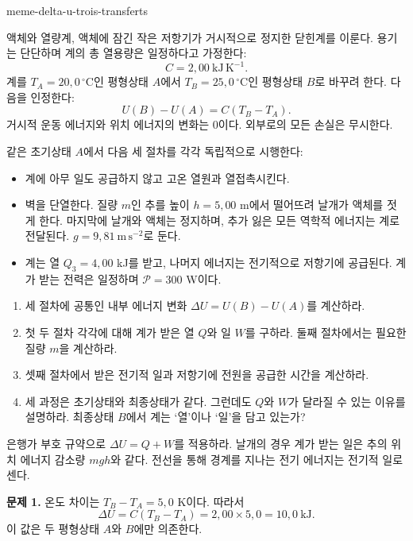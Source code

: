 \begin{exo}[같은 내부 에너지 변화, 세 가지 전달 방식]{meme-delta-u-trois-transferts}

액체와 열량계, 액체에 잠긴 작은 저항기가 거시적으로 정지한 닫힌계를 이룬다.
용기는 단단하며 계의 총 열용량은 일정하다고 가정한다:
\[
C=2{,}00\ \mathrm{kJ\,K^{-1}}.
\]
계를 $T_A=20{,}0\,^\circ\mathrm{C}$인 평형상태 $A$에서
$T_B=25{,}0\,^\circ\mathrm{C}$인 평형상태 $B$로 바꾸려 한다. 다음을 인정한다:
\[
U(B)-U(A)=C(T_B-T_A).
\]
거시적 운동 에너지와 위치 에너지의 변화는 0이다. 외부로의 모든 손실은 무시한다.

같은 초기상태 $A$에서 다음 세 절차를 각각 독립적으로 시행한다:
\begin{itemize}
\item[절차 1] 계에 아무 일도 공급하지 않고 고온 열원과 열접촉시킨다.
\item[절차 2] 벽을 단열한다. 질량 $m$인 추를 높이 $h=5{,}00$ m에서 떨어뜨려 날개가 액체를 젓게 한다. 마지막에 날개와 액체는 정지하며, 추가 잃은 모든 역학적 에너지는 계로 전달된다. $g=9{,}81\ \mathrm{m\,s^{-2}}$로 둔다.
\item[절차 3] 계는 열 $Q_3=4{,}00$ kJ를 받고, 나머지 에너지는 전기적으로 저항기에 공급된다. 계가 받는 전력은 일정하며 $\mathcal P=300$ W이다.
\end{itemize}

\begin{enumerate}
\item 세 절차에 공통인 내부 에너지 변화 $\Delta U=U(B)-U(A)$를 계산하라.
\item 첫 두 절차 각각에 대해 계가 받은 열 $Q$와 일 $W$를 구하라. 둘째 절차에서는 필요한 질량 $m$을 계산하라.
\item 셋째 절차에서 받은 전기적 일과 저항기에 전원을 공급한 시간을 계산하라.
\item 세 과정은 초기상태와 최종상태가 같다. 그런데도 $Q$와 $W$가 달라질 수 있는 이유를 설명하라. 최종상태 $B$에서 계는 ‘열’이나 ‘일’을 담고 있는가?
\end{enumerate}

\begin{indication}
은행가 부호 규약으로 $\Delta U=Q+W$를 적용하라. 날개의 경우 계가 받는 일은
추의 위치 에너지 감소량 $mgh$와 같다. 전선을 통해 경계를 지나는 전기 에너지는 전기적 일로 센다.
\end{indication}

\begin{solution}
\textbf{문제 1.} 온도 차이는 $T_B-T_A=5{,}0$ K이다. 따라서
\[
\Delta U=C(T_B-T_A)
=2{,}00\times5{,}0
=10{,}0\ \mathrm{kJ}.
\]
이 값은 두 평형상태 $A$와 $B$에만 의존한다.


\end{solution}
\end{exo}
